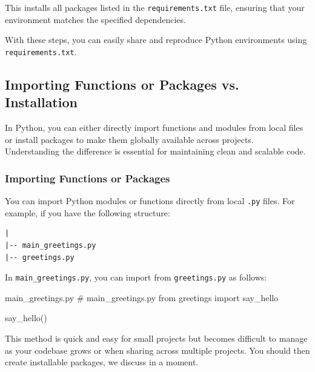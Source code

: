 This installs all packages listed in the \texttt{requirements.txt} file, ensuring that your environment matches the specified dependencies.

With these steps, you can easily share and reproduce Python environments using \texttt{requirements.txt}.

%
\subsection{Importing Functions or Packages vs. Installation}

In Python, you can either directly import functions and modules from local files or install packages to make them globally available across projects. Understanding the difference is essential for maintaining clean and scalable code.

%
\subsubsection{Importing Functions or Packages}


You can import Python modules or functions directly from local \texttt{.py} files. For example, if you have the following structure:

\begin{lstlisting}[basicstyle=\ttfamily\small]
|
|-- main_greetings.py
|-- greetings.py
\end{lstlisting}

In \textnormal{\texttt{main\_greetings.py}}, you can import from \texttt{greetings.py} as follows:

\begin{codeonly}{main\_greetings.py}
# main_greetings.py
from greetings import say_hello

say_hello()
\end{codeonly}

This method is quick and easy for small projects but becomes difficult to manage as your codebase grows or when sharing across multiple projects. You should then create installable packages, we discuss in a moment. 

%
